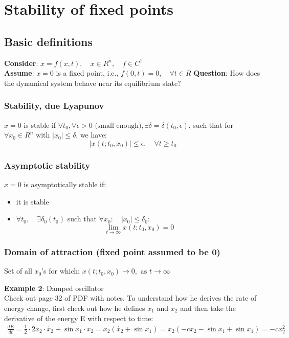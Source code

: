 \section{Stability of fixed points}
\label{chap03}

\subsection{Basic definitions}

\textbf{Consider}: $\dot{x}=f(x,t), \quad x \in R^n, \quad f \in C^1$\\
\textbf{Assume}: $x=0$ is a fixed point, i.e., $f(0,t)=0, \quad \forall t \in R$ 
\textbf{Question}: How does the dynamical system behave near its equilibrium state?

\subsubsection{Stability, due Lyapunov}
$x=0$ is stable if $\forall t_0, \forall \epsilon > 0 \text{ (small enough)}, \exists \delta=\delta(t_0, \epsilon)$, such that for $\forall x_0 \in R^n \text{ with } |x_0| 	\leq \delta$, we have:
$$|x(t;t_0,x_0)|\leq\epsilon, \quad \forall t \geq t_0$$

\subsubsection{Asymptotic stability}
$x=0$ is asymptotically stable if:
\begin{itemize}
    \item it is stable
    \item $\forall t_0, \quad \exists \delta_0(t_0)$ such that $\forall x_0: \quad |x_0|\leq \delta_0$: \\
    $$\lim_{t\to\infty} x(t;t_0, x_0)=0$$
\end{itemize}

\subsubsection{Domain of attraction (fixed point assumed to be 0)}
Set of all $x_0$'s for which: $x(t;t_0,x_0)\to0, \text{ as } t\to\infty$

\textbf{Example 2}: Damped oscillator\\
Check out page 32 of PDF with notes. To understand how he derives the rate of energy change, first check out how he defines $x_1$ and $x_2$ and then take the derivative of the energy E with respect to time:
\begin{align}
    \frac{dE}{dt}=\frac{1}{2}\cdot2x_2\cdot\dot{x_2}+\sin x_1\cdot x_2=x_2(\dot{x_2}+\sin x_1) = x_2(-cx_2-\sin x_1 + \sin x_1)=-cx_2^2  
\end{align}

